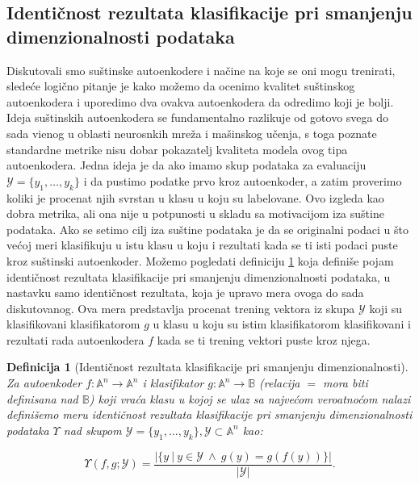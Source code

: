 \documentclass{article}
\newtheorem{definition}{Definicija}
\begin{document}
	\subsection{Identi\v cnost rezultata klasifikacije pri smanjenju dimenzionalnosti podataka}
	
	Diskutovali smo su\v stinske autoenkodere i na\v cine na koje se oni mogu trenirati, slede\'ce logi\v cno pitanje je kako mo\v zemo da ocenimo kvalitet su\v stinskog autoenkodera i uporedimo dva ovakva autoenkodera da odredimo koji je bolji.
	Ideja su\v stinskih autoenkodera se fundamentalno razlikuje od gotovo svega do sada vi\dj enog u oblasti neurosnkih mre\v za i ma\v sinskog u\v cenja, s toga poznate standardne metrike nisu dobar pokazatelj kvaliteta modela ovog tipa autoenkodera.
	Jedna ideja je da ako imamo skup podataka za evaluaciju $\mathcal{Y} = \{y_1, \dots, y_k\}$ i da pustimo podatke prvo kroz autoenkoder, a zatim proverimo koliki je procenat njih svrstan u klasu u koju su labelovane.
	Ovo izgleda kao dobra metrika, ali ona nije u potpunosti u skladu sa motivacijom iza su\v stine podataka.
	Ako se setimo cilj iza su\v stine podataka je da se originalni podaci u \v sto ve\'coj meri klasifikuju u istu klasu u koju i rezultati kada se ti isti podaci puste kroz su\v stinski autoenkoder.
	Mo\v zemo pogledati definiciju \ref{identicality-of-results-of-classification-upon-dimensionality-reduction} koja defini\v se pojam identi\v cnost rezultata klasifikacije pri smanjenju dimenzionalnosti podataka, u nastavku samo identi\v cnost rezultata, koja je upravo mera ovoga do sada diskutovanog. 
	Ova mera predstavlja procenat trening vektora iz skupa $\mathcal{Y}$ koji su klasifikovani klasifikatorom $g$ u klasu u koju su istim klasifikatorom klasifikovani i rezultati rada autoenkodera $f$ kada se ti trening vektori puste kroz njega.
	
	\begin{definition}[Identi\v cnost rezultata klasifikacije pri smanjenju dimenzionalnosti]
		\label{identicality-of-results-of-classification-upon-dimensionality-reduction}
		\sloppy Za autoenkoder $f : \mathbb{A}^n \to \mathbb{A}^n$ i klasifikator $g : \mathbb{A}^n \to \mathbb{B}$ (relacija $=$ mora biti definisana nad $\mathbb{B}$) koji vra\'ca klasu u kojoj se ulaz sa najve\'com veroatno\'com nalazi defini\v semo meru \emph{identi\v cnost rezultata klasifikacije pri smanjenju dimenzionalnosti podataka $\Upsilon$ nad skupom $\mathcal{Y} = \{y_1, \dots, y_k\}, \mathcal {Y} \subset \mathbb{A}^n$} kao:
		
		$$
		\Upsilon (f, g; \mathcal{Y}) = \frac{\left| \{y ~|~ y \in \mathcal{Y}~ \wedge~ g(y) = g(f(y))\}\right|}{\left| \mathcal{Y} \right|}.
		$$
	\end{definition}
\end{document}
